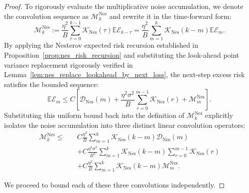 \begin{proof}
To rigorously evaluate the multiplicative noise accumulation, we denote the convolution sequence as $\mathcal M_k^{\mathrm{Nes}}$ and rewrite it in the time-forward form:
\begin{equation*}
    \mathcal M_k^{\mathrm{Nes}} := \frac{\eta^2}{B} \sum_{\tau=0}^{k-1} \mathcal{K}_{\mathrm{Nes}}(\tau) \mathbb{E}\mathcal{E}_{k-\tau} = \frac{\eta^2}{B} \sum_{m=1}^{k} \mathcal{K}_{\mathrm{Nes}}(k-m) \mathbb{E}\mathcal{E}_m.
\end{equation*}
By applying the Nesterov expected risk recursion established in Proposition~\ref{prop:nes_risk_recursion} and substituting the look-ahead point variance replacement rigorously verified in Lemma~\ref{lem:nes_replace_lookahead_by_next_loss}, the next-step excess risk satisfies the bounded sequence:
\begin{equation*}
    \mathbb{E}\mathcal E_m \le C\left[ \mathcal D_{\mathrm{Nes}}(m) + \frac{\eta^2\sigma^2}{B} \sum_{r=0}^{m-1}\mathcal K_{\mathrm{Nes}}(r) + \mathcal M_m^{\mathrm{Nes}} \right].
\end{equation*}
Substituting this uniform bound back into the definition of $\mathcal M_k^{\mathrm{Nes}}$ explicitly isolates the noise accumulation into three distinct linear convolution operators:
\begin{align}
\label{eq:nes_mixed_bootstrap_start}
    \mathcal M_k^{\mathrm{Nes}} \le\quad 
    &C \frac{\eta^2}{B}\sum_{m=1}^{k} \mathcal K_{\mathrm{Nes}}(k-m)\mathcal D_{\mathrm{Nes}}(m) \nonumber \\
    &+ C \frac{\eta^4\sigma^2}{B^2}\sum_{m=1}^{k}\mathcal K_{\mathrm{Nes}}(k-m)\sum_{r=0}^{m-1}\mathcal K_{\mathrm{Nes}}(r) \nonumber \\
    &+ C \frac{\eta^2}{B}\sum_{m=1}^{k} \mathcal K_{\mathrm{Nes}}(k-m)\mathcal M_m^{\mathrm{Nes}}.
\end{align}

We proceed to bound each of these three convolutions independently.


\end{proof}

